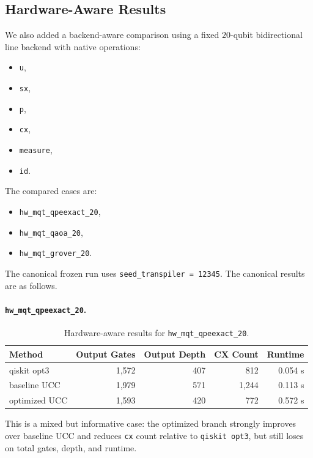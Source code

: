 \documentclass[11pt]{article}
\begin{document}
\subsection{Hardware-Aware Results}

We also added a backend-aware comparison using a fixed $20$-qubit bidirectional line backend with native operations:
\begin{itemize}[leftmargin=1.5em]
    \item \texttt{u},
    \item \texttt{sx},
    \item \texttt{p},
    \item \texttt{cx},
    \item \texttt{measure},
    \item \texttt{id}.
\end{itemize}

The compared cases are:
\begin{itemize}[leftmargin=1.5em]
    \item \texttt{hw\_mqt\_qpeexact\_20},
    \item \texttt{hw\_mqt\_qaoa\_20},
    \item \texttt{hw\_mqt\_grover\_20}.
\end{itemize}

The canonical frozen run uses \texttt{seed\_transpiler = 12345}. The canonical results are as follows.

\paragraph{\texttt{hw\_mqt\_qpeexact\_20}.}
\begin{table}[h]
\centering
\begin{tabular}{lrrrr}
\toprule
Method & Output Gates & Output Depth & CX Count & Runtime \\
\midrule
qiskit opt3 & 1{,}572 & 407 & 812 & 0.054 s \\
baseline UCC & 1{,}979 & 571 & 1{,}244 & 0.113 s \\
optimized UCC & 1{,}593 & 420 & 772 & 0.572 s \\
\bottomrule
\end{tabular}
\caption{Hardware-aware results for \texttt{hw\_mqt\_qpeexact\_20}.}
\end{table}

This is a mixed but informative case: the optimized branch strongly improves over baseline UCC and reduces \texttt{cx} count relative to \texttt{qiskit opt3}, but still loses on total gates, depth, and runtime.
\end{document}
